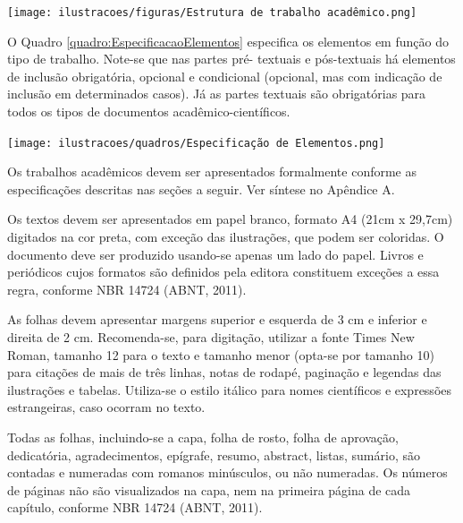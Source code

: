 \begin{Desenvolvimento}
\begin{figura}[h!]
  \centering
  \addfigura
  \texttt{[image: ilustracoes/figuras/Estrutura de trabalho acadêmico.png]}
  \label{figura:EstruturaTrabalhoAcademico}
\end{figura}

O Quadro \ref{quadro:EspecificacaoElementos} especifica os elementos em função do tipo de trabalho. Note-se que nas partes pré- textuais e pós-textuais há elementos de inclusão obrigatória, opcional e condicional (opcional, mas com indicação de inclusão em determinados casos). Já as partes textuais são obrigatórias para todos os tipos de documentos acadêmico-científicos.

\begin{quadro} [h!]
  \centering
  \addquadro
  \texttt{[image: ilustracoes/quadros/Especificação de Elementos.png]}
  \label{quadro:EspecificacaoElementos}
\end{quadro}

Os trabalhos acadêmicos devem ser apresentados formalmente conforme as especificações descritas nas seções a seguir. Ver síntese no Apêndice A.

Os textos devem ser apresentados em papel branco, formato A4 (21cm x 29,7cm) digitados na cor preta, com exceção das ilustrações, que podem ser coloridas. O documento deve ser produzido usando-se apenas um lado do papel. Livros e periódicos cujos formatos são definidos pela editora constituem exceções a essa regra, conforme NBR 14724 (ABNT, 2011).

As folhas devem apresentar margens superior e esquerda de 3 cm e inferior e direita de 2 cm. Recomenda-se, para digitação, utilizar a fonte Times New Roman, tamanho 12 para o texto e tamanho menor (opta-se por tamanho 10) para citações de mais de três linhas, notas de rodapé, paginação e legendas das ilustrações e tabelas. Utiliza-se o estilo itálico para nomes científicos e expressões estrangeiras, caso ocorram no texto.

Todas as folhas, incluindo-se a capa, folha de rosto, folha de aprovação, dedicatória, agradecimentos, epígrafe, resumo, abstract, listas, sumário, são contadas e numeradas com romanos minúsculos, ou não numeradas. Os números de páginas não são visualizados na capa, nem na primeira página de cada capítulo, conforme NBR 14724 (ABNT, 2011).


\end{Desenvolvimento}
